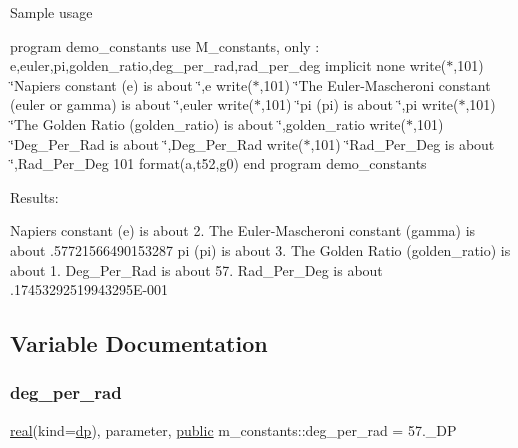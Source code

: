 Sample usage

program demo\+\_\+constants use M\+\_\+constants, only \+: e,euler,pi,golden\+\_\+ratio,deg\+\_\+per\+\_\+rad,rad\+\_\+per\+\_\+deg implicit none write($\ast$,101) \char`\"{}\+Napier\textquotesingle{}s constant (e) is about \char`\"{},e write($\ast$,101) \char`\"{}\+The Euler-\/\+Mascheroni constant (euler or gamma) is about \char`\"{},euler write($\ast$,101) \char`\"{}pi (pi) is about \char`\"{},pi write($\ast$,101) \char`\"{}\+The Golden Ratio (golden\+\_\+ratio) is about \char`\"{},golden\+\_\+ratio write($\ast$,101) \char`\"{}\+Deg\+\_\+\+Per\+\_\+\+Rad is about \char`\"{},Deg\+\_\+\+Per\+\_\+\+Rad write($\ast$,101) \char`\"{}\+Rad\+\_\+\+Per\+\_\+\+Deg is about \char`\"{},Rad\+\_\+\+Per\+\_\+\+Deg 101 format(a,t52,g0) end program demo\+\_\+constants

Results\+:

Napier\textquotesingle{}s constant (e) is about 2. The Euler-\/\+Mascheroni constant (gamma) is about .57721566490153287 pi (pi) is about 3. The Golden Ratio (golden\+\_\+ratio) is about 1. Deg\+\_\+\+Per\+\_\+\+Rad is about 57. Rad\+\_\+\+Per\+\_\+\+Deg is about .17453292519943295\+E-\/001 

\subsection{Variable Documentation}
\mbox{\label{namespacem__constants_ac3ff54a4212c8fd52f7a560c143beb13}} 
\subsubsection{\texorpdfstring{deg\+\_\+per\+\_\+rad}{deg\_per\_rad}}
{\footnotesize\ttfamily \hyperlink{read__watch_83_8txt_abdb62bde002f38ef75f810d3a905a823}{real}(kind=\hyperlink{namespacem__constants_a15743b6f1a6f57ab5b842d79fbffdd98}{dp}), parameter, \hyperlink{M__stopwatch_83_8txt_a2f74811300c361e53b430611a7d1769f}{public} m\+\_\+constants\+::deg\+\_\+per\+\_\+rad = 57.\+\_\+\+DP}

\mbox{\label{namespacem__constants_a15743b6f1a6f57ab5b842d79fbffdd98}} 
